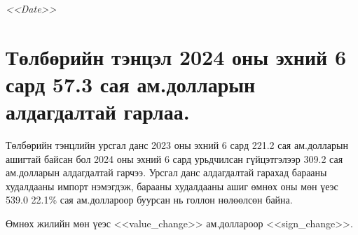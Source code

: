 
\begin{flushright}
    \textit{<<Date>>} %
\end{flushright}


\section*{Төлбөрийн тэнцэл 2024 оны эхний 6 сард 57.3 сая
ам.долларын алдагдалтай гарлаа.}

Төлбөрийн тэнцлийн урсгал данс 2023 оны эхний 6 сард 221.2 сая
ам.долларын ашигтай байсан бол 2024 оны эхний 6 сард урьдчилсан
гүйцэтгэлээр 309.2 сая ам.долларын алдагдалтай гарчээ. Урсгал данс алдагдалтай гарахад
барааны худалдааны импорт нэмэгдэж, барааны худалдааны ашиг өмнөх оны мөн үеэс 539.0
22.1\% сая ам.доллароор буурсан нь голлон нөлөөлсөн байна.

Өмнөх жилийн мөн үеэс <<value_change>> ам.доллароор <<sign_change>>. 